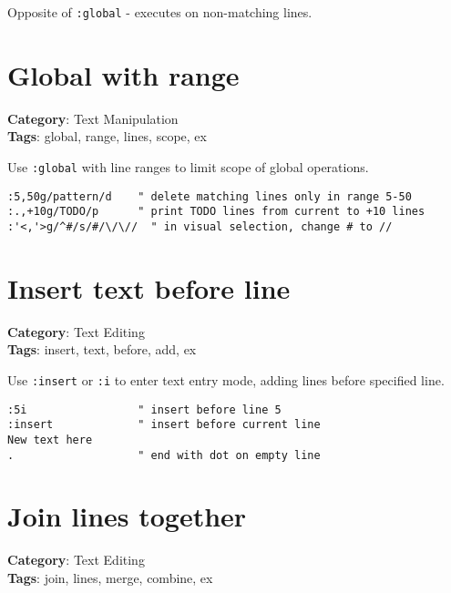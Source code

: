 {{{{Opposite of {\footnotesize \Verb§:global§} - executes on non-matching lines.

\section{Global with range}

\textbf{Category}: Text Manipulation\\ \textbf{Tags}: global, range, lines, scope, ex
\vspace{0.5cm}

Use {\footnotesize \Verb§:global§} with line ranges to limit scope of global operations.

\begin{Exa*}{}
\begin{Verbatim}[fontsize=\footnotesize, breaklines, breakanywhere]
:5,50g/pattern/d    " delete matching lines only in range 5-50
:.,+10g/TODO/p      " print TODO lines from current to +10 lines
:'<,'>g/^#/s/#/\/\//  " in visual selection, change # to //
\end{Verbatim}
\end{Exa*}

\section{Insert text before line}

\textbf{Category}: Text Editing\\ \textbf{Tags}: insert, text, before, add, ex
\vspace{0.5cm}

Use {\footnotesize \Verb§:insert§} or {\footnotesize \Verb§:i§} to enter text entry mode, adding lines before specified line.

\begin{Exa*}{}
\begin{Verbatim}[fontsize=\footnotesize, breaklines, breakanywhere]
:5i                 " insert before line 5
:insert             " insert before current line
New text here
.                   " end with dot on empty line
\end{Verbatim}
\end{Exa*}

\section{Join lines together}

\textbf{Category}: Text Editing\\ \textbf{Tags}: join, lines, merge, combine, ex
\vspace{0.5cm}

}}}}
